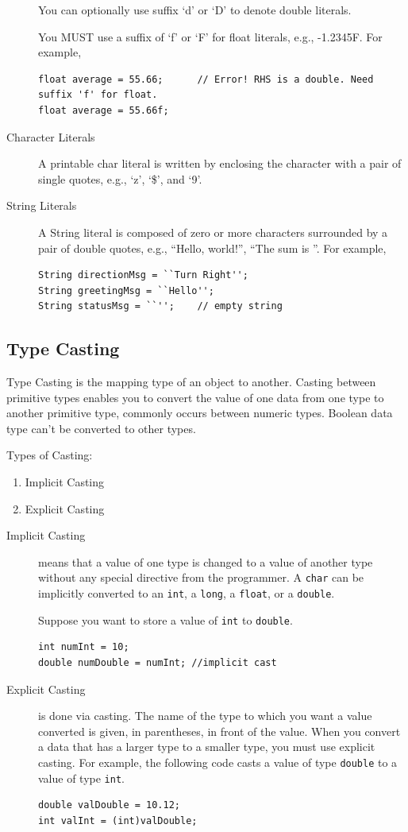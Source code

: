 \documentclass[11pt,a4paper]{article}
\begin{document}
\begin{description}
You can optionally use suffix `d' or `D' to denote double literals.

You MUST use a suffix of `f' or `F' for float literals, e.g., -1.2345F. For example,
\begin{lstlisting}[numbers=none]
float average = 55.66;      // Error! RHS is a double. Need suffix 'f' for float.
float average = 55.66f;
\end{lstlisting}
\item [Character Literals]
A printable char literal is written by enclosing the character with a pair of single quotes, e.g., `z', `\$', and `9'.
\item [String Literals]
A String literal is composed of zero or more characters surrounded by a pair of double quotes, e.g., ``Hello, world!'', ``The sum is ''. For example,
\begin{lstlisting}[numbers=none]
String directionMsg = ``Turn Right'';
String greetingMsg = ``Hello'';
String statusMsg = ``'';    // empty string
\end{lstlisting}
\end{description}
\subsection*{Type Casting}
Type Casting is the mapping type of an object to another. Casting between primitive types enables you to convert the value of one data from one type to another primitive type, commonly occurs between numeric types. Boolean data type can't be converted to other types.

Types of Casting:
\begin{enumerate}
\item Implicit Casting
\item Explicit Casting
\end{enumerate}
\begin{description}
\item [Implicit Casting] means that a value of one type is changed to a value of another type without any special directive from the programmer. A \lstinline!char! can be implicitly converted to an \lstinline!int!, a \lstinline!long!, a \lstinline!float!, or a \lstinline!double!. 

Suppose you want to store a value of \lstinline!int! to \lstinline!double!.
\begin{verbatim}
int numInt = 10;
double numDouble = numInt; //implicit cast
\end{verbatim}
\item [Explicit Casting] is done via casting. The name of the type to which you want a value converted is given, in parentheses, in front of the value. When you convert a data that has a larger type to a smaller type, you must use explicit casting. For example, the following code casts a value of type \lstinline!double! to a value of type \lstinline!int!.
\begin{verbatim}
double valDouble = 10.12;
int valInt = (int)valDouble;
\end{verbatim}
\end{description}
\end{document}
